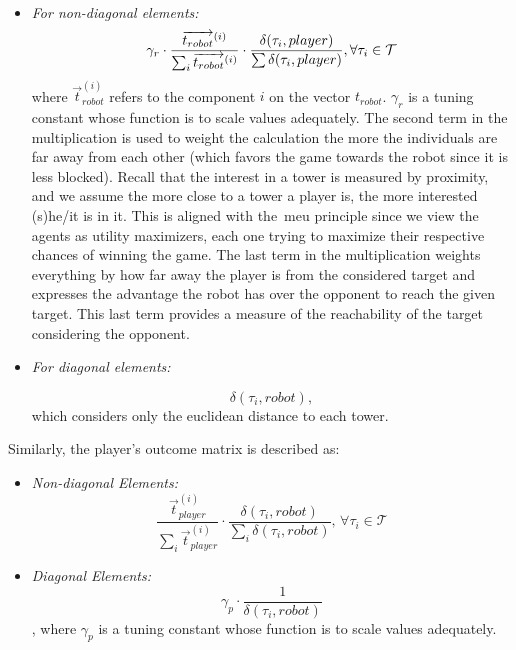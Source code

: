 \begin{itemize}
\item \textit{For non-diagonal elements:}\\

\begin{equation}
    \label{eq:Non-diagonal}
    \gamma_r \cdot \frac{\overrightarrow{t_{robot}}^{(i)}}{\sum_{i}{\overrightarrow{t_{robot}}^{(i)}}} \cdot \frac{\delta(\tau_{i},player)}{\sum{\delta(\tau_{i},player)}}, \forall\tau_{i} \in \mathcal{T}\\ 
\end{equation}
where $\overrightarrow{t}^{(i)}_{robot}$ refers to the component $i$ on the vector $t_{robot}$. $\gamma_r$ is a tuning constant whose function is to scale values adequately. The second term in the multiplication is used to weight the calculation %
the more the individuals are far away from each other (which favors the game towards the robot since it is less blocked). Recall that the interest in a tower is measured by proximity, and we assume the more close to a tower a player is, the more interested (s)he/it is in it. This is aligned with the~\gls{meu} principle since we view the agents as utility maximizers, each one trying to maximize their respective chances of winning the game. The last term in the multiplication weights everything by how far away the player is from the considered target and expresses the advantage the robot has over the opponent to reach the given target. This last term provides a measure of the reachability of the target considering the opponent.

\item \textit{For diagonal elements:}

\begin{equation}
    \label{eq:Diagonal}
    \delta(\tau_{i},robot),
\end{equation}
 which considers only the euclidean distance to each tower.
\end{itemize}

Similarly, the player's outcome matrix is described as:
\begin{itemize}
    \item \textit{Non-diagonal Elements:}\\
        \begin{equation}
            \label{for:Non-DiagonalPlayer}
            \frac{\overrightarrow{t}^{(i)}_{player}}{\sum_{i}{\overrightarrow{t}^{(i)}_{player}}} \cdot \frac{\delta(\tau_{i},robot)}{\sum_{i}{\delta(\tau_{i},robot)}}, \, \forall\tau_{i} \in \mathcal{T} 
        \end{equation}
    \item \textit{Diagonal Elements:}
        \begin{equation}
            \label{for:DiagonalPlayer}
            \gamma_p \cdot \frac{1}{\delta(\tau_{i},robot)}
        \end{equation},
        where $\gamma_p$ is a tuning constant whose function is to scale values adequately.
\end{itemize}

